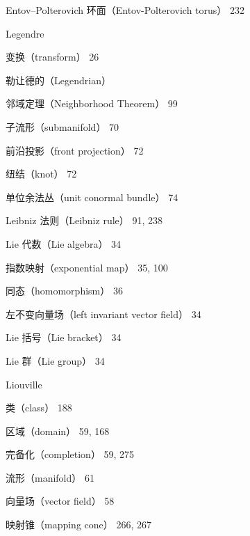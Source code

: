 {\noindent\hspace*{4.5em}Entov–Polterovich 环面（Entov-Polterovich torus） 232\par
\noindent Legendre\par
\noindent\hspace*{1.5em}变换（transform） 26\par
\noindent 勒让德的（Legendrian）\par
\noindent\hspace*{1.5em}邻域定理（Neighborhood Theorem） 99\par
\noindent\hspace*{1.5em}子流形（submanifold） 70\par
\noindent\hspace*{3em}前沿投影（front projection） 72\par
\noindent\hspace*{3em}纽结（knot） 72\par
\noindent\hspace*{3em}单位余法丛（unit conormal bundle） 74\par
\noindent Leibniz 法则（Leibniz rule） 91, 238\par
\noindent Lie 代数（Lie algebra） 34\par
\noindent\hspace*{1.5em}指数映射（exponential map） 35, 100\par
\noindent\hspace*{1.5em}同态（homomorphism） 36\par
\noindent\hspace*{1.5em}左不变向量场（left invariant vector field） 34\par
\noindent Lie 括号（Lie bracket） 34\par
\noindent Lie 群（Lie group） 34\par
\noindent Liouville\par
\noindent\hspace*{1.5em}类（class） 188\par
\noindent\hspace*{1.5em}区域（domain） 59, 168\par
\noindent\hspace*{3em}完备化（completion） 59, 275\par
\noindent\hspace*{1.5em}流形（manifold） 61\par
\noindent\hspace*{1.5em}向量场（vector field） 58\par
\noindent 映射锥（mapping cone） 266, 267\par
}
